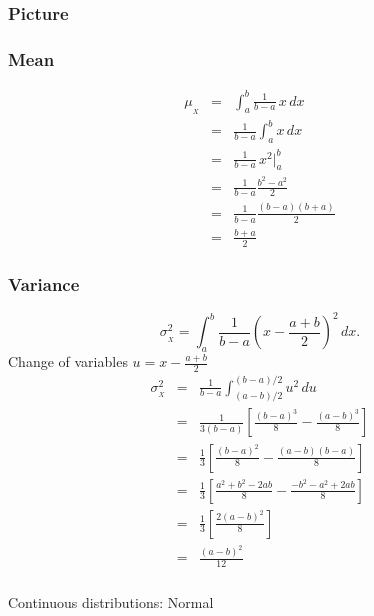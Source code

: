 \begin{frame}[fragile]\frametitle{Picture}


\end{frame}


\begin{frame}[fragile]\frametitle{Mean}

\begin{eqnarray*}
\mu_{_X} & = & \int_a^b  \frac{1}{b-a} \, x \, dx \\ 
        & = & \frac{1}{b-a} \int_a^b x \, dx \\ 
        & = & \frac{1}{b-a} \, x^2|_a^b \\ 
        & = & \frac{1}{b-a} \frac{b^2-a^2}{2} \\ 
        & = & \frac{1}{b-a} \frac{(b-a)(b+a)}{2} \\
        & = & \frac{b+a}{2}
\end{eqnarray*}

\end{frame}

\begin{frame}[fragile]\frametitle{Variance}

{\tiny
$$\sigma^2_{_X}  =  \int_a^b  \frac{1}{b-a} (x-\frac{a+b}{2})^2 \,
dx.$$ 
Change of variables $u = x-\frac{a+b}{2}$ 
\begin{eqnarray*}
\sigma^2_{_X} & = & \frac{1}{b-a} \int_{(a-b)/2}^{(b-a)/2}  u^2 \,  du
\\ 
        & = & \frac{1}{3(b-a)} \left[ \frac{(b-a)^3}{8} -
          \frac{(a-b)^3}{8}   \right] \\ 
        & = & \frac{1}{3}  \left[ \frac{(b-a)^2}{8} -
          \frac{(a-b)(b-a)}{8}   \right] \\ 
        & = & \frac{1}{3}  \left[ \frac{a^2+b^2- 2ab }{8} -
          \frac{-b^2-a^2+2ab}{8}   \right] \\ 
        & = & \frac{1}{3}  \left[ \frac{2(a-b)^2}{8} \right] \\ 
        & = & \frac{(a-b)^2}{12}
\end{eqnarray*}

}
\end{frame}


\begin{frame}[fragile]\frametitle{}
\begin{center}
{\Large Continuous distributions: Normal }

\end{center}
\end{frame}




